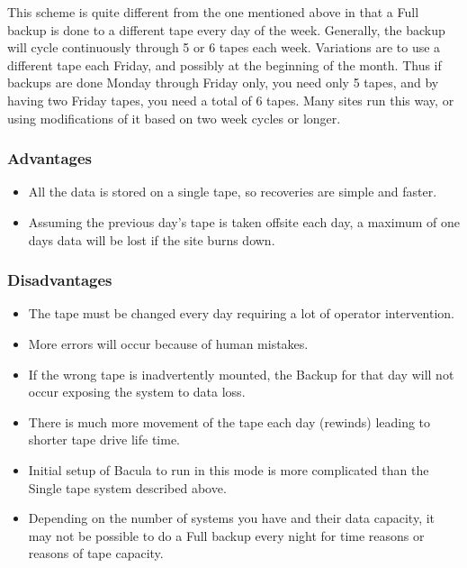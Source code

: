 This scheme is quite different from the one mentioned above in that a Full
backup is done to a different tape every day of the week. Generally, the
backup will cycle continuously through 5 or 6 tapes each week. Variations are
to use a different tape each Friday, and possibly at the beginning of the
month. Thus if backups are done Monday through Friday only, you need only 5
tapes, and by having two Friday tapes, you need a total of 6 tapes. Many sites
run this way, or using modifications of it based on two week cycles or longer.


\subsubsection*{Advantages}

\begin{itemize}
\item All the data is stored on a single tape, so recoveries  are simple and
   faster.  
\item Assuming the previous day's tape is taken offsite each  day, a maximum
   of one days data will be lost if the  site burns down. 
   \end{itemize}

\subsubsection*{Disadvantages}

\begin{itemize}
\item The tape must be changed every day requiring a lot of  operator
   intervention.  
\item More errors will occur because of human mistakes.  
\item If the wrong tape is inadvertently mounted, the Backup for  that day
   will not occur exposing the system to data loss.  
\item There is much more movement of the tape each day (rewinds)  leading to
   shorter tape drive life time.  
\item Initial setup of Bacula to run in this mode is more complicated  than
   the Single tape system described above.  
\item Depending on the number of systems you have and their data  capacity, it
   may not be possible to do a Full backup every  night for time reasons or
   reasons of tape capacity. 
\end{itemize}

